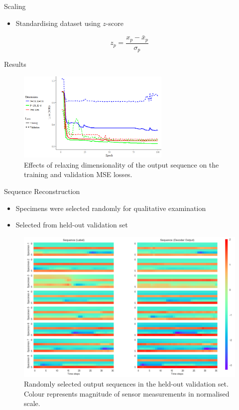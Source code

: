 \documentclass{beamer}
\begin{document}
\begin{frame}{Scaling}
  \begin{itemize}
    \item Standardising dataset using \(z\)-score
  \end{itemize}
  \[ z_p=\frac{x_p-\bar{x}_p}{\sigma_p} \]
\end{frame}

\begin{frame}{Results}
  \begin{figure}[h]
  	\centering
  	\includegraphics[width=0.65\textwidth]{output_dims.png}
  	\caption{Effects of relaxing dimensionality of the output sequence on the training and validation MSE losses.}

  \end{figure}
\end{frame}

\begin{frame}[shrink]{Sequence Reconstruction}
  \begin{itemize}
    \item Specimens were selected randomly for qualitative examination
    \item Selected from held-out validation set
  \end{itemize}
  \begin{figure}[H]
  	\centering
  	\includegraphics[width=1\textwidth]{heatmaps.png}
  	\caption{Randomly selected output sequences in the held-out validation set. Colour represents magnitude of sensor measurements in normalised scale.}
  \end{figure}
\end{frame}
\end{document}
